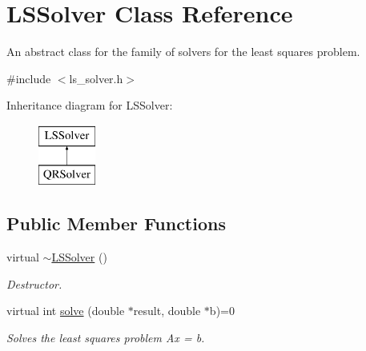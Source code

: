 \hypertarget{classLSSolver}{\section{L\-S\-Solver Class Reference}
\label{classLSSolver}
}


An abstract class for the family of solvers for the least squares problem.  




{\ttfamily \#include $<$ls\-\_\-solver.\-h$>$}

Inheritance diagram for L\-S\-Solver\-:\begin{figure}[H]
\begin{center}
\leavevmode
\includegraphics[height=2.000000cm]{classLSSolver}
\end{center}
\end{figure}
\subsection*{Public Member Functions}
\begin{DoxyCompactItemize}
\item 
virtual \hyperlink{classLSSolver_ad52195d34383f38d85568be604c1fa3e}{$\sim$\-L\-S\-Solver} ()
\begin{DoxyCompactList}\small\item\em Destructor. \end{DoxyCompactList}\item 
virtual int \hyperlink{classLSSolver_a82b3ec289e811512b8dadc933a0637fc}{solve} (double $\ast$result, double $\ast$b)=0
\begin{DoxyCompactList}\small\item\em Solves the least squares problem Ax = b. \end{DoxyCompactList}\end{DoxyCompactItemize}

